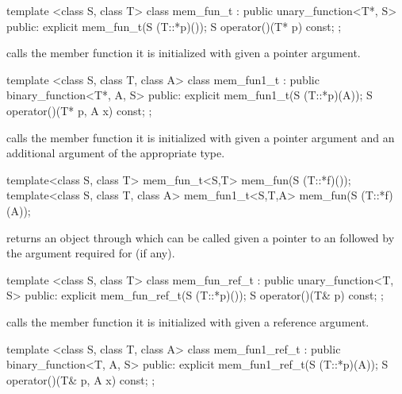 %
\begin{itemdecl}
template <class S, class T> class mem_fun_t
        : public unary_function<T*, S> {
public:
  explicit mem_fun_t(S (T::*p)());
  S operator()(T* p) const;
};
\end{itemdecl}

\begin{itemdescr}
\pnum
{} calls the member function it is initialized with given a pointer
argument.
\end{itemdescr}

%
\begin{itemdecl}
template <class S, class T, class A> class mem_fun1_t
      : public binary_function<T*, A, S> {
public:
  explicit mem_fun1_t(S (T::*p)(A));
  S operator()(T* p, A x) const;
};
\end{itemdecl}

\begin{itemdescr}
\pnum
{} calls the member function it is initialized with given
a pointer argument and an additional argument of the appropriate type.
\end{itemdescr}

%
\begin{itemdecl}
template<class S, class T> mem_fun_t<S,T>
   mem_fun(S (T::*f)());
template<class S, class T, class A> mem_fun1_t<S,T,A>
   mem_fun(S (T::*f)(A));
\end{itemdecl}

\begin{itemdescr}
\pnum
{} returns an object through which  can be
called given a pointer to an  followed by the argument required for
 (if any).
\end{itemdescr}

%
\begin{itemdecl}
template <class S, class T> class mem_fun_ref_t
      : public unary_function<T, S> {
public:
  explicit mem_fun_ref_t(S (T::*p)());
  S operator()(T& p) const;
};
\end{itemdecl}

\begin{itemdescr}
\pnum
{} calls the member function it is initialized with given
a reference argument.
\end{itemdescr}

%
\begin{itemdecl}
template <class S, class T, class A> class mem_fun1_ref_t
      : public binary_function<T, A, S> {
public:
  explicit mem_fun1_ref_t(S (T::*p)(A));
  S operator()(T& p, A x) const;
};
\end{itemdecl}

